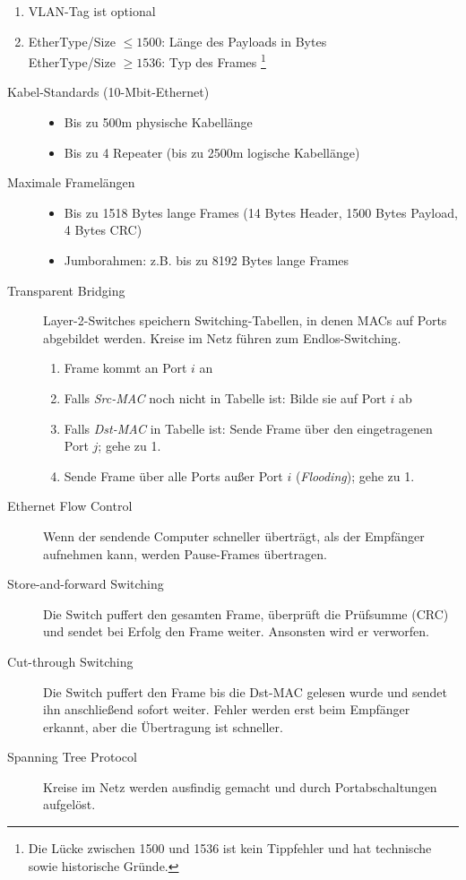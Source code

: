 \documentclass[a4paper]{article}
\begin{document}
%
\begin{enumerate}[label=(\roman*)]
    \item VLAN-Tag ist optional
    \item EtherType/Size $\leq 1500$: Länge des Payloads in Bytes \\
        EtherType/Size $\geq 1536$: Typ des Frames \footnote{Die Lücke zwischen 1500 und 1536 ist kein Tippfehler und hat technische sowie historische Gründe.}
\end{enumerate}
%
\begin{description}
    \item[Kabel-Standards (10-Mbit-Ethernet)] \hfill
    \begin{itemize}
        \item Bis zu 500m physische Kabellänge
        \item Bis zu 4 Repeater (bis zu 2500m logische Kabellänge)
    \end{itemize}
    \item[Maximale Framelängen] \hfill
    \begin{itemize}
        \item Bis zu 1518 Bytes lange Frames (14 Bytes Header, 1500 Bytes Payload, 4 Bytes CRC)
        \item Jumborahmen: z.B. bis zu 8192 Bytes lange Frames
    \end{itemize}
    \item[Transparent Bridging] Layer-2-Switches speichern Switching-Tabellen, in denen MACs auf Ports abgebildet werden. Kreise im Netz führen zum Endlos-Switching.
    \begin{enumerate}
        \item Frame kommt an Port $i$ an
        \item Falls \textit{Src-MAC} noch nicht in Tabelle ist: Bilde sie auf Port $i$ ab
        \item Falls \textit{Dst-MAC} in Tabelle ist: Sende Frame über den eingetragenen Port $j$; gehe zu 1.
        \item Sende Frame über alle Ports außer Port $i$ (\textit{Flooding}); gehe zu 1.
    \end{enumerate}
    \item[Ethernet Flow Control] Wenn der sendende Computer schneller überträgt, als der Empfänger aufnehmen kann, werden Pause-Frames übertragen.
    \item[Store-and-forward Switching] Die Switch puffert den gesamten Frame, überprüft die Prüfsumme (CRC) und sendet bei Erfolg den Frame weiter. Ansonsten wird er verworfen.
    \item[Cut-through Switching] Die Switch puffert den Frame bis die Dst-MAC gelesen wurde und sendet ihn anschließend sofort weiter. Fehler werden erst beim Empfänger erkannt, aber die Übertragung ist schneller.
    \item[Spanning Tree Protocol] Kreise im Netz werden ausfindig gemacht und durch Portabschaltungen aufgelöst.
\end{description}
\end{document}
